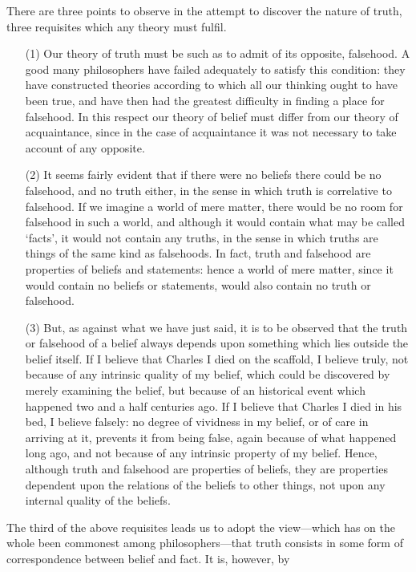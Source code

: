 \documentclass[oneside,letterpaper,12pt]{book}
\begin{document}
There are three points to observe in the attempt to discover the nature
of truth, three requisites which any theory must fulfil.
\begin{enumerate}
	\item[(1)] Our theory of truth must be such as to admit of its opposite, falsehood. 
	A good many philosophers have failed adequately to satisfy this condition: 
	they have constructed theories according to which all our thinking ought to 
	have been true, and have then had the greatest difficulty in finding a place 
	for falsehood. In this respect our theory of belief must differ from our theory 
	of acquaintance, since in the case of acquaintance it was not necessary to take 
	account of any opposite. 
	\item[(2)] It seems fairly evident that if there were no beliefs there could be no 
	falsehood, and no truth either, in the sense in which truth is correlative to 
	falsehood. If we imagine a world of mere matter, there would be no room for 
	falsehood in such a world, and although it would contain what may be called 
	`facts', it would not contain any truths, in the sense in which truths are things 
	of the same kind as falsehoods. In fact, truth and falsehood are properties of 
	beliefs and statements: hence a world of mere matter, since it would contain 
	no beliefs or statements, would also contain no truth or falsehood.
	\item[(3)] But, as against what we have just said, it is to be observed that the truth 
	or falsehood of a belief always depends upon something which lies outside the 
	belief itself. If I believe that Charles I died on the scaffold, I believe truly, not 
	because of any intrinsic quality of my belief, which could be discovered by 
	merely examining the belief, but because of an historical event which happened 
	two and a half centuries ago. If I believe that Charles I died in his bed, I believe 
	falsely: no degree of vividness in my belief, or of care in arriving at it, prevents 
	it from being false, again because of what happened long ago, and not because 
	of any intrinsic property of my belief. Hence, although truth and falsehood are 
	properties of beliefs, they are properties dependent upon the relations of the 
	beliefs to other things, not upon any internal quality of the beliefs.
\end{enumerate}
The third of the above requisites leads us to adopt the view---which has
on the whole been commonest among philosophers---that truth consists in
some form of correspondence between belief and fact. It is, however, by
\end{document}
